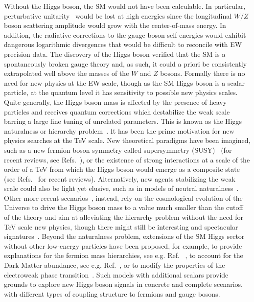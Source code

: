 \documentclass[12pt]{article}
\begin{document}
Without the Higgs boson, the SM would not have been calculable. In particular, perturbative unitarity~\cite{PhysRevLett.30.1268,PhysRevD.10.1145,LlewellynSmith:1973yud,PhysRevD.16.1519} would be lost at high energies since the longitudinal $W/Z$ boson scattering amplitude would grow with the center-of-mass energy. In addition, the radiative corrections to the gauge boson self-energies would exhibit dangerous logarithmic divergences that would be difficult to reconcile with EW precision data. The discovery of the Higgs boson verified that the SM is a spontaneously broken gauge theory and, as such, it could a priori be consistently extrapolated well above the masses of the $W$ and $Z$ bosons. Formally there is no need for new physics at the EW scale, though as the SM Higgs boson is a scalar particle, at the quantum level it has sensitivity to possible new physics scales. Quite generally, the Higgs boson mass is affected by the presence of heavy particles and receives quantum corrections which destabilize the weak scale barring a large fine tuning of unrelated parameters. This is known as the Higgs naturalness or hierarchy problem~\cite{PhysRevD.3.1818,tHooft:1980xss}. It has been the prime motivation for new physics searches at the TeV scale. New theoretical paradigms have been imagined, such as a new fermion-boson symmetry called supersymmetry (SUSY)~\cite{WESS19741} (for recent reviews, see Refs.~\cite{Martin:1997ns,Allanchach:2019wrx}), or the existence of strong interactions at a scale of the order of a TeV from which the Higgs boson would emerge as a composite state~\cite{Georgi:1986im} (see Refs.~\cite{Bellazzini:2014yua,Panico:2015jxa,Csaki:2015hcd} for recent reviews). Alternatively, new agents stabilizing the weak scale could also be light yet elusive, such as in models of neutral naturalness~\cite{Chacko:2005pe,Chacko:2005un,Craig:2015pha,Craig:2014aea}. Other more recent scenarios~\cite{Craig:2014aea,Graham:2015cka,Espinosa:2015eda}, instead, rely on the cosmological evolution of the Universe to drive the Higgs boson mass to a value much smaller than the cutoff of the theory and aim at alleviating the hierarchy problem without the need for TeV scale new physics, though there might still be interesting and spectacular signatures~\cite{Craig:2014aea,Graham:2015cka,Espinosa:2015eda,Flacke:2016szy}. Beyond the naturalness problem, extensions of the SM Higgs sector without other low-energy particles have been proposed, for example, to provide explanations for the fermion mass hierarchies, see e.g. Ref. ~\cite{Bauer:2015fxa,Bauer:2015kzy}, to account for the Dark Matter abundance, see e.g. Ref.~\cite{Barbieri:2006dq}, or to modify the properties of the electroweak phase transition~\cite{Morrissey:2012db}. Such models with additional scalars provide grounds to explore new Higgs boson signals in concrete and complete scenarios, with different types of coupling structure to fermions and gauge bosons.
\end{document}
